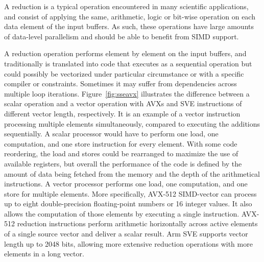 \documentclass[5p,times,twocolumn]{elsarticle}
\begin{document}
A reduction is a typical operation encountered in many scientific applications, and consist of applying the same, arithmetic, logic or bit-wise operation on each data element of the input buffers. As such, these operations have large amounts of data-level parallelism and should be able
to benefit from SIMD support.

%
A reduction operation performs element by element on the input buffers,
and traditionally is translated into code that executes as a sequential operation but could possibly be vectorized
under particular circumstance or with a specific compiler or constraints. Sometimes
it may suffer from dependencies across multiple loop iterations.
%
Figure~\ref{fig:sseavx} illustrates the difference between a scalar operation and
a vector operation with AVXs and SVE instructions of different vector length, respectively.
%
It is an example of a vector instruction processing multiple elements simultaneously,
compared to executing the additions sequentially. A scalar processor would have to perform one load,
one computation, and one store instruction for every element. With some code reordering, the load and stores could be rearranged to maximize the use of available registers, but overall the performance of the code is defined by the amount of data being fetched from the memory and the depth of the arithmetical instructions. A vector processor performs one load,
one computation, and one store for multiple elements.
More specifically, AVX-512 SIMD-vector can process up to eight double-precision floating-point numbers or 16 integer values. It also allows the computation of those elements by executing a single instruction.
AVX-512 reduction instructions perform arithmetic horizontally across active elements of a
single source vector and deliver a scalar result. Arm SVE supports vector length up to 2048 bits,
allowing more extensive reduction operations with more elements in a long vector.
\end{document}
